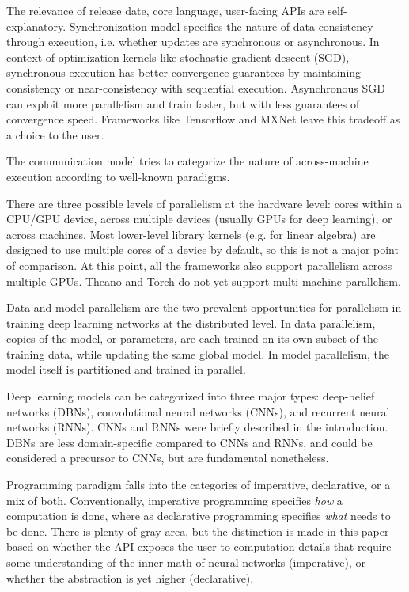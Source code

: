 The relevance of release date, core language, user-facing APIs are self-explanatory. Synchronization model specifies the nature of data consistency through execution, i.e. whether updates are synchronous or asynchronous. In context of optimization kernels like stochastic gradient descent (SGD), synchronous execution has better convergence guarantees by maintaining consistency or near-consistency with sequential execution. Asynchronous SGD can exploit more parallelism and train faster, but with less guarantees of convergence speed. Frameworks like Tensorflow and MXNet leave this tradeoff as a choice to the user. 

The communication model tries to categorize the nature of across-machine execution according to well-known paradigms.

There are three possible levels of parallelism at the hardware level: cores within a CPU/GPU device, across multiple devices (usually GPUs for deep learning), or across machines. Most lower-level library kernels (e.g. for linear algebra) are designed to use multiple cores of a device by default, so this is not a major point of comparison. At this point, all the frameworks also support parallelism across multiple GPUs. Theano and Torch do not yet support multi-machine parallelism. 

Data and model parallelism are the two prevalent opportunities for parallelism in training deep learning networks at the distributed level. In data parallelism, copies of the model, or parameters, are each trained on its own subset of the training data, while updating the same global model. In model parallelism, the model itself is partitioned and trained in parallel. 

Deep learning models can be categorized into three major types: deep-belief networks (DBNs), convolutional neural networks (CNNs), and recurrent neural networks (RNNs). CNNs and RNNs were briefly described in the introduction. DBNs are less domain-specific compared to CNNs and RNNs, and could be considered a precursor to CNNs, but are fundamental nonetheless. 

Programming paradigm falls into the categories of imperative, declarative, or a mix of both. Conventionally, imperative programming specifies \textit{how} a computation is done, where as declarative programming specifies \textit{what} needs to be done. There is plenty of gray area, but the distinction is made in this paper based on whether the API exposes the user to computation details that require some understanding of the inner math of neural networks (imperative), or whether the abstraction is yet higher (declarative). 

